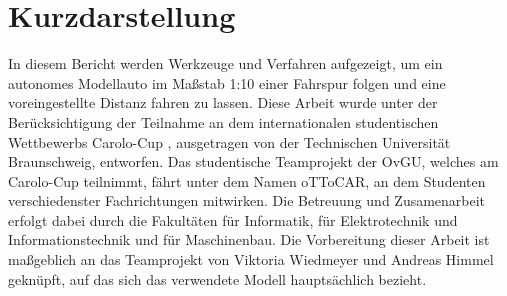 \maketitle 
\setcounter{tocdepth}{2}

\section*{Kurzdarstellung}
In diesem Bericht werden Werkzeuge und Verfahren aufgezeigt, um ein autonomes Modellauto im Maßstab 1:10 einer Fahrspur folgen und eine voreingestellte Distanz fahren zu lassen. Diese Arbeit wurde unter der Berücksichtigung der Teilnahme an dem internationalen studentischen Wettbewerbs Carolo-Cup \cite{RegelW}, ausgetragen von der Technischen Universität Braunschweig, entworfen. Das studentische Teamprojekt der OvGU, welches am Carolo-Cup teilnimmt, fährt unter dem Namen oTToCAR, an dem Studenten verschiedenster Fachrichtungen mitwirken. Die Betreuung und Zusamenarbeit erfolgt dabei durch die Fakultäten für Informatik, für Elektrotechnik und Informationstechnik und für Maschinenbau. Die Vorbereitung dieser Arbeit ist maßgeblich an das Teamprojekt \cite{VikAnd} von Viktoria Wiedmeyer und Andreas Himmel geknüpft, auf das sich das verwendete Modell hauptsächlich bezieht. 